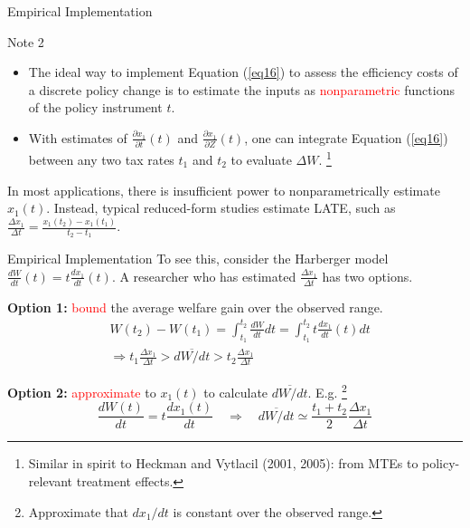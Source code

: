 \documentclass{beamer}
\begin{document}
\begin{frame}{Empirical Implementation}
	\begin{block}{Note 2}
		\begin{itemize}
			\item The ideal way to implement Equation (\ref{eq16}) to assess the efficiency costs of a discrete policy change is to estimate the inputs as \textcolor{red}{nonparametric} functions of the policy instrument $t$.
			\item With estimates of $\frac{\partial x_1}{\partial t}(t)$ and $\frac{\partial x_1}{\partial Z}(t)$, one can integrate Equation (\ref{eq16}) between any two tax rates $t_1$ and $t_2$ to evaluate $\Delta W$. \footnote{Similar in spirit to Heckman and Vytlacil (2001, 2005): from MTEs to policy-relevant treatment effects.}
		\end{itemize}
	\end{block}
	\medskip

	In most applications, there is insufficient power to nonparametrically estimate $x_1(t)$. Instead, typical reduced-form studies estimate LATE, such as $\frac{\Delta x_1}{\Delta t}=\frac{x_1(t_2)-x_1(t_1)}{t_2-t_1}$.
\end{frame}
\begin{frame}[label=step5]{Empirical Implementation}
	To see this, consider the Harberger model $\frac{dW}{dt}(t)=t\frac{dx_1}{dt}(t)$. A researcher who has estimated $\frac{\Delta x_1}{\Delta t}$ has two options.
	\medskip

	\textbf{Option 1:} \textcolor{red}{bound} the average welfare gain over the observed range.
	\begin{equation}
		\begin{aligned}
			& W(t_2) - W(t_1) = \int_{t_1}^{t_2}\frac{dW}{dt}dt=\int_{t_1}^{t_2}t\frac{dx_1}{dt}(t)dt \\
			& \Rightarrow t_1\frac{\Delta x_1}{\Delta t}>\overline{dW/dt}>t_2\frac{\Delta x_1}{\Delta t}
		\end{aligned}
	\end{equation}
	\hfill\hyperlink{triangle}{}

	\textbf{Option 2:} \textcolor{red}{approximate} to $x_1(t)$ to calculate $\overline{dW/dt}$. E.g. \footnote{Approximate that $dx_1/dt$ is constant over the observed range.}
	\begin{equation}
		\frac{dW(t)}{dt}=t\frac{dx_1(t)}{dt}\quad\Rightarrow\quad \overline{dW/dt}\simeq \frac{t_1+t_2}{2}\frac{\Delta x_1}{\Delta t}
	\end{equation}
	\hfill\hyperlink{ex_feldstein1995}{}
\end{frame}
\end{document}
